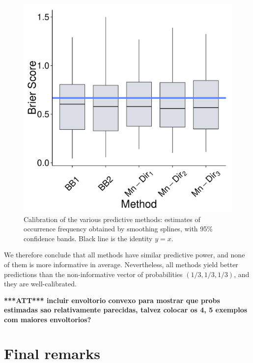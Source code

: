 \documentclass[journal,article,accept,moreauthors,pdftex,12pt,a4paper]{mdpi}
\newcommand{\red}[1]{\textbf{\color{red} ***ATT*** #1}}
\begin{document}
\begin{figure}[H]
\includegraphics[page=9,scale=0.3]{futebolComparacaoModelosForPaper.pdf}
  \caption{Calibration of the various predictive methods: estimates of occurrence frequency obtained by smoothing splines, with 95\% confidence bands. Black line is the identity $y=x$.}
  \label{fig::calibration}
\end{figure}

We therefore conclude that all methods have similar predictive power, and none of them is more informative in average.
Nevertheless, all methods yield better predictions than the non-informative vector of probabilities $(1/3,1/3,1/3)$, and they are well-calibrated.

\red{incluir envoltorio convexo para mostrar que probs estimadas sao relativamente parecidas, talvez colocar os 4, 5 exemplos com maiores envoltorios?}


\section{Final remarks}
\label{sec::remarks}

\end{document}

